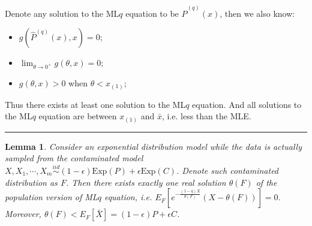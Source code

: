 \documentclass[a4paper]{article}
\newenvironment{proof}{{\bf Proof:  }}{\hfill\rule{2mm}{2mm}}
\newtheorem{lemma}[fact]{Lemma}
\renewcommand{\hat}{\widehat}
\begin{document}
\begin{proof}
Denote any solution to the ML$q$ equation to be $\hat{P}^{(q)}(x)$, then we also know:
\begin{itemize}
\item $g(\hat{P}^{(q)}(x), x) = 0$;
\item $\lim_{\theta \rightarrow 0^+}g(\theta, x) = 0$;
\item $g(\theta, x) > 0$ when $\theta < x_{(1)}$;
\end{itemize}

Thus there exists at least one solution to the ML$q$ equation. And all solutions to the ML$q$ equation are between $x_{(1)}$ and $\bar{x}$, i.e. less than the MLE.
\end{proof}

\begin{lemma}
\label{lemma:PopulationLqExist}
Consider an exponential distribution model while the data is actually sampled from the contaminated model $X, X_1, \cdots, X_m \stackrel{iid}{\sim} (1-\epsilon) \mathrm{Exp}(P) + \epsilon \mathrm{Exp}(C)$. Denote such contaminated distribution as $F$.
Then there exists exactly one real solution $\theta(F)$ of the population version of ML$q$ equation,
i.e. $E_F[e^{-\frac{(1-q)X}{\theta(F)}}(X - \theta(F))] = 0$. Moreover, $\theta(F) < E_F[\bar{X}] = (1-\epsilon) P + \epsilon C$.
\end{lemma}
\end{document}
